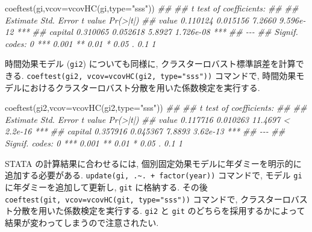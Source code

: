 \documentclass[
  letterpaper,
  xelatex,
  ja=standard, xelatex]{bxjsbook}
\newenvironment{Shaded}{\begin{snugshade}}{\end{snugshade}}
\newcommand{\AttributeTok}[1]{\textcolor[rgb]{0.40,0.45,0.13}{#1}}
\newcommand{\DocumentationTok}[1]{\textcolor[rgb]{0.37,0.37,0.37}{\textit{#1}}}
\newcommand{\FunctionTok}[1]{\textcolor[rgb]{0.28,0.35,0.67}{#1}}
\newcommand{\NormalTok}[1]{\textcolor[rgb]{0.00,0.23,0.31}{#1}}
\newcommand{\StringTok}[1]{\textcolor[rgb]{0.13,0.47,0.30}{#1}}
\begin{document}
\begin{Shaded}
\begin{Highlighting}[]
\FunctionTok{coeftest}\NormalTok{(gi,}\AttributeTok{vcov=}\FunctionTok{vcovHC}\NormalTok{(gi,}\AttributeTok{type=}\StringTok{"sss"}\NormalTok{))}
\DocumentationTok{\#\# }
\DocumentationTok{\#\# t test of coefficients:}
\DocumentationTok{\#\# }
\DocumentationTok{\#\#         Estimate Std. Error t value  Pr(\textgreater{}|t|)    }
\DocumentationTok{\#\# value   0.110124   0.015156  7.2660 9.596e{-}12 ***}
\DocumentationTok{\#\# capital 0.310065   0.052618  5.8927 1.726e{-}08 ***}
\DocumentationTok{\#\# {-}{-}{-}}
\DocumentationTok{\#\# Signif. codes:  0 \textquotesingle{}***\textquotesingle{} 0.001 \textquotesingle{}**\textquotesingle{} 0.01 \textquotesingle{}*\textquotesingle{} 0.05 \textquotesingle{}.\textquotesingle{} 0.1 \textquotesingle{} \textquotesingle{} 1}
\end{Highlighting}
\end{Shaded}

時間効果モデル (\texttt{gi2}) についても同様に,
クラスターロバスト標準誤差を計算できる.
\texttt{coeftest(gi2,\ vcov=vcovHC(gi2,\ type="sss"))} コマンドで,
時間効果モデルにおけるクラスターロバスト分散を用いた係数検定を実行する.

\begin{Shaded}
\begin{Highlighting}[]
\FunctionTok{coeftest}\NormalTok{(gi2,}\AttributeTok{vcov=}\FunctionTok{vcovHC}\NormalTok{(gi2,}\AttributeTok{type=}\StringTok{"sss"}\NormalTok{))}
\DocumentationTok{\#\# }
\DocumentationTok{\#\# t test of coefficients:}
\DocumentationTok{\#\# }
\DocumentationTok{\#\#         Estimate Std. Error t value  Pr(\textgreater{}|t|)    }
\DocumentationTok{\#\# value   0.117716   0.010263 11.4697 \textless{} 2.2e{-}16 ***}
\DocumentationTok{\#\# capital 0.357916   0.045367  7.8893  3.62e{-}13 ***}
\DocumentationTok{\#\# {-}{-}{-}}
\DocumentationTok{\#\# Signif. codes:  0 \textquotesingle{}***\textquotesingle{} 0.001 \textquotesingle{}**\textquotesingle{} 0.01 \textquotesingle{}*\textquotesingle{} 0.05 \textquotesingle{}.\textquotesingle{} 0.1 \textquotesingle{} \textquotesingle{} 1}
\end{Highlighting}
\end{Shaded}

STATA の計算結果に合わせるには,
個別固定効果モデルに年ダミーを明示的に追加する必要がある.
\texttt{update(gi,\ .\textasciitilde{}.\ +\ factor(year))} コマンドで,
モデル \texttt{gi} に年ダミーを追加して更新し, \texttt{git} に格納する.
その後 \texttt{coeftest(git,\ vcov=vcovHC(git,\ type="sss"))}
コマンドで, クラスターロバスト分散を用いた係数検定を実行する.
\texttt{gi2} と \texttt{git}
のどちらを採用するかによって結果が変わってしまうので注意されたい.
\end{document}
